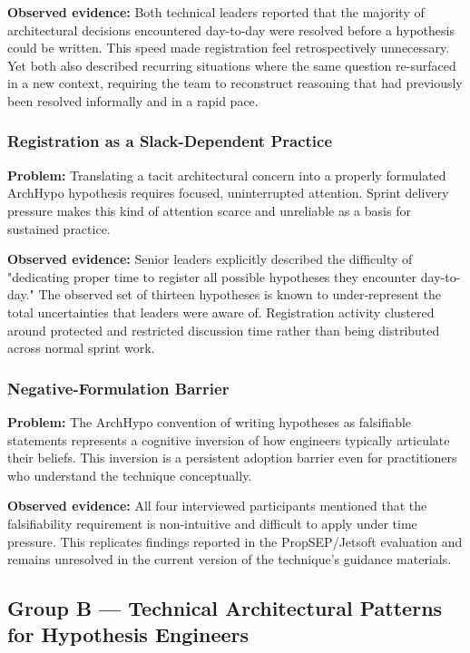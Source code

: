 \textbf{Observed evidence:} Both technical leaders reported that the majority of
architectural decisions encountered day-to-day were resolved before a hypothesis
could be written. This speed made registration feel retrospectively unnecessary.
Yet both also described recurring situations where the same question re-surfaced
in a new context, requiring the team to reconstruct reasoning that had previously
been resolved informally and in a rapid pace.

\subsubsection{Registration as a Slack-Dependent Practice}
\label{subsubsec:pattern-a3}

\textbf{Problem:} Translating a tacit architectural concern into a properly
formulated ArchHypo hypothesis requires focused, uninterrupted attention.
Sprint delivery pressure makes this kind of attention scarce and unreliable as
a basis for sustained practice.

\textbf{Observed evidence:} Senior leaders explicitly described the difficulty
of "dedicating proper time to register all possible hypotheses they encounter
day-to-day." The observed set of thirteen hypotheses is known to
under-represent the total uncertainties that leaders were aware of. Registration
activity clustered around protected and restricted discussion time rather than being distributed
across normal sprint work.

\subsubsection{Negative-Formulation Barrier}
\label{subsubsec:pattern-a4}
\textbf{Problem:} The ArchHypo convention of writing hypotheses as falsifiable
statements represents a cognitive inversion of how engineers typically articulate their beliefs.
This inversion is a persistent adoption barrier even for practitioners who
understand the technique conceptually.

\textbf{Observed evidence:} All four interviewed participants mentioned that the
falsifiability requirement is non-intuitive and difficult to apply under time
pressure. This replicates findings reported in the PropSEP/Jetsoft evaluation
\citep{silva2025archhypo} and remains unresolved in the current version of
the technique's guidance materials.

\subsection{Group B — Technical Architectural Patterns for Hypothesis
            Engineers}
\label{sec:group-b-patterns}

